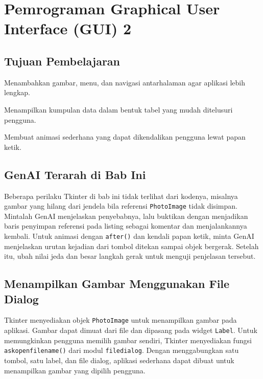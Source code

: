 \chapter{Pemrograman Graphical User Interface (GUI) 2}

\section*{Tujuan Pembelajaran}
\begin{daftarrapat}
  \item Menambahkan gambar, menu, dan navigasi antarhalaman agar aplikasi lebih lengkap.
  \item Menampilkan kumpulan data dalam bentuk tabel yang mudah ditelusuri pengguna.
  \item Membuat animasi sederhana yang dapat dikendalikan pengguna lewat papan ketik.
\end{daftarrapat}

\section*{GenAI Terarah di Bab Ini}

Beberapa perilaku Tkinter di bab ini tidak terlihat dari kodenya, misalnya gambar yang hilang dari jendela bila referensi \texttt{PhotoImage} tidak disimpan. Mintalah GenAI menjelaskan penyebabnya, lalu buktikan dengan menjadikan baris penyimpan referensi pada listing sebagai komentar dan menjalankannya kembali. Untuk animasi dengan \texttt{after()} dan kendali papan ketik, minta GenAI menjelaskan urutan kejadian dari tombol ditekan sampai objek bergerak. Setelah itu, ubah nilai jeda dan besar langkah gerak untuk menguji penjelasan tersebut.

\section{Menampilkan Gambar Menggunakan File Dialog}

Tkinter menyediakan objek \texttt{PhotoImage} untuk menampilkan gambar pada aplikasi. Gambar dapat dimuat dari file dan dipasang pada widget \texttt{Label}. Untuk memungkinkan pengguna memilih gambar sendiri, Tkinter menyediakan fungsi \texttt{askopenfilename()} dari modul \texttt{filedialog}. Dengan menggabungkan satu tombol, satu label, dan file dialog, aplikasi sederhana dapat dibuat untuk menampilkan gambar yang dipilih pengguna.

